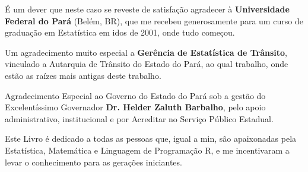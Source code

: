 \begin{refsection}


É um dever que neste caso se reveste de satisfação agradecer à \textbf{Universidade Federal do Pará} (Belém, BR), que me recebeu generosamente para um curso de graduação em Estatística em idos de 2001, onde tudo começou.
\vst

Um agradecimento muito especial a \textbf{Gerência de Estatística de Trânsito}, vinculado a Autarquia de Trânsito do Estado do Pará, ao qual trabalho, onde estão as raízes mais antigas deste trabalho.
\vst

Agradecimento Especial ao Governo do Estado do Pará sob a gestão do Excelentíssimo Governador \textbf{Dr. Helder Zaluth Barbalho}, pelo apoio administrativo, institucional e por Acreditar no Serviço Público Estadual.
\vst



Este Livro é dedicado a todas as pessoas que, igual a min, são apaixonadas pela Estatística, Matemática e Linguagem de Programação R, e me incentivaram a levar o conhecimento para as gerações iniciantes.
\vst







\printbibliography[heading=subbibliography]
\end{refsection}
